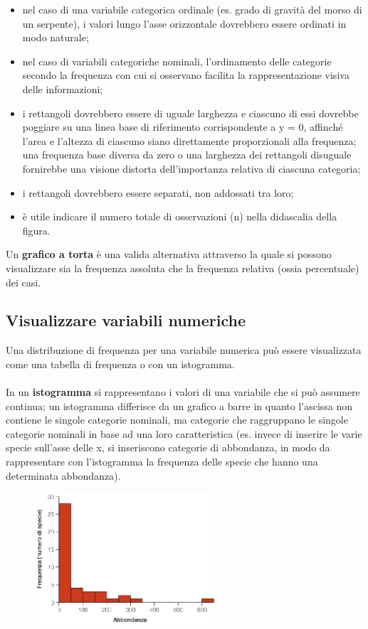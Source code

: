 \documentclass[10pt, draft]{book}
\newcommand{\tightlist}{%
\setlength{\itemsep}{1pt}\setlength{\parskip}{0pt}\setlength{\parsep}{0pt}}
\begin{document}
\begin{itemize} \tightlist
    \item nel caso di una variabile categorica ordinale (es. grado di gravità del morso di un serpente), i valori lungo l'asse orizzontale dovrebbero essere ordinati in modo naturale;
    \item nel caso di variabili categoriche nominali, l'ordinamento delle categorie secondo la frequenza con cui si osservano facilita la rappresentazione visiva delle informazioni;
    \item i rettangoli dovrebbero essere di uguale larghezza e ciascuno di essi dovrebbe poggiare su una linea base di riferimento corrispondente a y = 0, affinché l'area e l'altezza di ciascuno siano direttamente proporzionali alla frequenza; una frequenza base diversa da zero o una larghezza dei rettangoli disuguale fornirebbe una visione distorta dell'importanza relativa di ciascuna categoria;
    \item i rettangoli dovrebbero essere separati, non addossati tra loro;
    \item è utile indicare il numero totale di osservazioni (n) nella didascalia della figura.
\end{itemize}
Un \textbf{grafico a torta} è una valida alternativa attraverso la quale si possono visualizzare sia la frequenza assoluta che la frequenza relativa (ossia percentuale) dei casi.

\subsection{Visualizzare variabili numeriche}
Una distribuzione di frequenza per una variabile numerica può essere visualizzata come una tabella di frequenza o con un istogramma.
\\
\\
In un \textbf{istogramma} si rappresentano i valori di una variabile che si può assumere continua; un istogramma differisce da un grafico a barre in quanto l'ascissa non contiene le singole categorie nominali, ma categorie che raggruppano le singole categorie nominali in base ad una loro caratteristica (es. invece di inserire le varie specie sull'asse delle x, si inseriscono categorie di abbondanza, in modo da rappresentare con l'istogramma la frequenza delle specie che hanno una determinata abbondanza).\\
    \begin{figure}[h]\label{fig2.1-2}
    \centering
    \includegraphics[width=0.6\textwidth]{fig2.1-2}
    \caption{\small{}}
    \end{figure}
\end{document}
